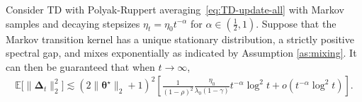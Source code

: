 \begin{theorem}\label{thm:markov-L2-convergence}
Consider TD with Polyak-Ruppert averaging~\eqref{eq:TD-update-all} with Markov samples and decaying stepsizes $\eta_t = \eta_0 t^{-\alpha}$ for $\alpha \in (\frac{1}{2},1)$. Suppose that the Markov transition kernel has a unique stationary distribution, a strictly positive spectral gap, and mixes exponentially as indicated by Assumption \ref{as:mixing}.  It can then be guaranteed that when $t \to \infty$,
\begin{align*}
\mathbb{E}\big[\|\bm{\Delta}_t\|_2^2\big] \lesssim (2\|\bm{\theta}^\star\|_2+1)^2 \left[\frac{1}{(1-\rho)^2}\frac{\eta_0}{\lambda_0(1-\gamma)}t^{-\alpha} \log^2 t + o\left(t^{-\alpha} \log^2 t\right)\right].
\end{align*}
\end{theorem}

